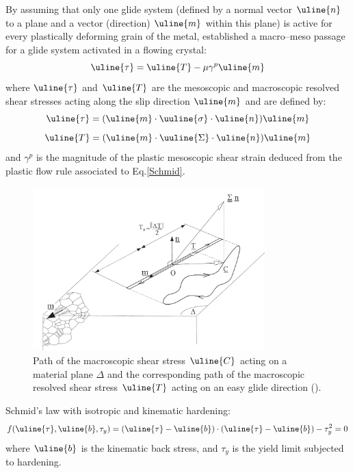 By assuming that only one glide system (defined by a normal vector $\uline{n}$ to a plane and a vector
(direction) $\uline{m}$ within this plane) is active for every plastically deforming grain of the metal, \cite{papadopoulos1993fatigue}
established a macro–meso passage for a glide system activated in a flowing crystal:
\begin{equation}
\uline{\tau}=\uline{T}-\mu\gamma^p\uline{m}
\label{macromeso}
\end{equation}
where $\uline{\tau}$ and $\uline{T}$ are the mesoscopic and macroscopic
resolved shear stresses acting along the slip direction $\uline{m}$ and are defined by:
\begin{equation}
\uline{\tau}=(\uline{m}\cdot\uuline{\sigma}\cdot\uline{n})\uline{m}
\label{tau}
\end{equation}
\begin{equation}
\uline{T}=(\uline{m}\cdot\uuline{\Sigma}\cdot\uline{n})\uline{m}
\label{T}
\end{equation}
and $\gamma^p$  is  the magnitude of the plastic mesoscopic shear strain deduced from the plastic flow rule associated to Eq.\ref{Schmid}.
\begin{figure}[h!]
	\centering
	\includegraphics[width=0.8\textwidth]{figures//glid.png} 
	\caption{Path of the macroscopic shear stress $\uline{C}$ acting on a material plane $\Delta$ and the corresponding path of the macroscopic resolved shear stress $\uline{T}$ acting on an easy glide direction (\cite{Morel2000101}).}
	\label{glid}
\end{figure}


Schmid's law with isotropic and kinematic hardening:
\begin{equation}
f(\uline{\tau},\uline{b},\tau_y)=(\uline{\tau}-\uline{b})\cdot(\uline{\tau}-\uline{b})-\tau_y^2=0
\label{Schmid}
\end{equation}
where $\uline{b}$ is the kinematic back stress, and $\tau_y$ is the yield limit subjected to hardening.

